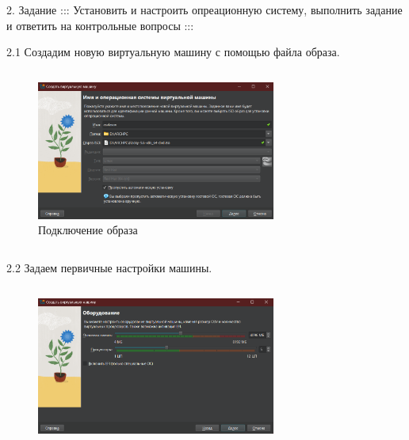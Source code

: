 \documentclass[
  ignorenonframetext,
  aspectratio=169,
]{beamer}
\begin{document}
\begin{frame}{2. Задание}
\label{ux437ux430ux434ux430ux43dux438ux435}
::: Установить и настроить опреационную систему, выполнить задание и
ответить на контрольные вопросы :::

\begin{block}{2.1 Создадим новую виртуальную машину с помощью файла
образа.}
\label{ux441ux43eux437ux434ux430ux434ux438ux43c-ux43dux43eux432ux443ux44e-ux432ux438ux440ux442ux443ux430ux43bux44cux43dux443ux44e-ux43cux430ux448ux438ux43dux443-ux441-ux43fux43eux43cux43eux449ux44cux44e-ux444ux430ux439ux43bux430-ux43eux431ux440ux430ux437ux430.}
\begin{columns}[c]
\begin{figure}

{\centering \includegraphics[width=0.7\textwidth,height=\textheight]{image/1.png}

}

\caption{Подключение образа}

\end{figure}%
\end{columns}
\end{block}

\begin{block}{2.2 Задаем первичные настройки машины.}
\label{ux437ux430ux434ux430ux435ux43c-ux43fux435ux440ux432ux438ux447ux43dux44bux435-ux43dux430ux441ux442ux440ux43eux439ux43aux438-ux43cux430ux448ux438ux43dux44b.}
\begin{columns}[c]
\begin{figure}

{\centering \includegraphics[width=0.7\textwidth,height=\textheight]{image/2.png}

}
\end{figure}
\end{columns}
\end{block}
\end{frame}
\end{document}
